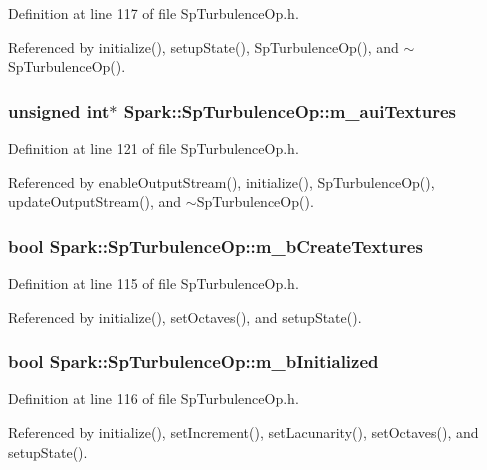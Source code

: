 Definition at line 117 of file Sp\-Turbulence\-Op.h.

Referenced by initialize(), setup\-State(), Sp\-Turbulence\-Op(), and $\sim$Sp\-Turbulence\-Op().
\subsubsection{\setlength{\rightskip}{0pt plus 5cm}unsigned int$\ast$ {\bf Spark::Sp\-Turbulence\-Op::m\_\-aui\-Textures}\hspace{0.3cm}{\tt  [protected]}}\label{classSpark_1_1SpTurbulenceOp_p16}


Definition at line 121 of file Sp\-Turbulence\-Op.h.

Referenced by enable\-Output\-Stream(), initialize(), Sp\-Turbulence\-Op(), update\-Output\-Stream(), and $\sim$Sp\-Turbulence\-Op().
\subsubsection{\setlength{\rightskip}{0pt plus 5cm}bool {\bf Spark::Sp\-Turbulence\-Op::m\_\-b\-Create\-Textures}\hspace{0.3cm}{\tt  [protected]}}\label{classSpark_1_1SpTurbulenceOp_p12}


Definition at line 115 of file Sp\-Turbulence\-Op.h.

Referenced by initialize(), set\-Octaves(), and setup\-State().
\subsubsection{\setlength{\rightskip}{0pt plus 5cm}bool {\bf Spark::Sp\-Turbulence\-Op::m\_\-b\-Initialized}\hspace{0.3cm}{\tt  [protected]}}\label{classSpark_1_1SpTurbulenceOp_p13}


Definition at line 116 of file Sp\-Turbulence\-Op.h.

Referenced by initialize(), set\-Increment(), set\-Lacunarity(), set\-Octaves(), and setup\-State().
